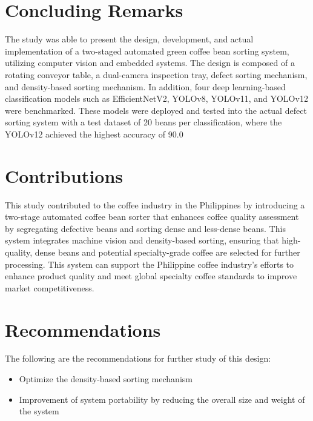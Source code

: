 \section{Concluding Remarks}

The study was able to present the design, development, and actual implementation of a two-staged automated green coffee bean sorting system, utilizing computer vision and embedded systems. The design is composed of a rotating conveyor table, a dual-camera inspection tray, defect sorting mechanism, and density-based sorting mechanism. In addition, four deep learning-based classification models such as EfficientNetV2, YOLOv8, YOLOv11, and YOLOv12 were benchmarked. These models were deployed and tested into the actual defect sorting system with a test dataset of 20 beans per classification, where the YOLOv12 achieved the highest accuracy of 90.0%

\section{Contributions}
This study contributed to the coffee industry in the Philippines by introducing a two-stage automated coffee bean sorter that enhances coffee quality assessment by segregating defective beans and sorting dense and less-dense beans. This system integrates machine vision and density-based sorting, ensuring that high-quality, dense beans and potential specialty-grade coffee are selected for further processing. This system can support the Philippine coffee industry’s efforts to enhance product quality and meet global specialty coffee standards to improve market competitiveness. 


\section{Recommendations}
The following are the recommendations for further study of this design:
\begin{itemize}
    \item Optimize the density-based sorting mechanism
    \item Improvement of system portability by reducing the overall size and weight of the system
\end{itemize}

